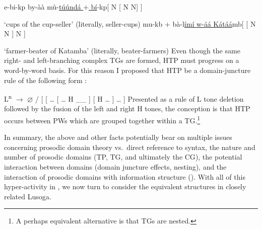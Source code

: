 \documentclass[output=paper]{langsci/langscibook}
\begin{document}
\ea\label{ex:13.18}
    \ea   e-bi-kp  by-àà  mù-\underline{túúndá $+$
    bí}-kp\hfill  [ N [ N N]
    ]\\\vspace{1\baselineskip}
		 ‘cups of the cup-seller’ (literally, seller-cups)
         \ex mu-kb $+$ bà-l\underline{ímí  w-áá
             Kátáá}mb\hfill [ [ N N ] N
             ]\\\vspace{1\baselineskip}
    ‘farmer-beater of Katamba' (literally, beater-farmers)
    \z
\z
Even though the same right- and left-branching complex \glspl{TG} are formed,
\gls{HTP} must progress on a word-by-word basis. For this reason I proposed
that \gls{HTP} be a domain-juncture rule of the following form
\citep[158]{Hyman1988}:

\ea\label{ex:13.19}
    L\textsuperscript{n}  ${\rightarrow}$  $\varnothing$  /  [  [ \dots{} [ \dots{} H \_\_ ] [ H \dots{} ] \dots{} ]
\z
Presented as a rule of L tone deletion followed by the fusion of the left and
right H tones, the conception is that \gls{HTP} occurs between \glspl{PW} which
are grouped together within a \gls{TG}.\footnote{A perhaps equivalent
    alternative is that \glspl{TG} are nested.}

In summary, the above and other  facts potentially bear on multiple
issues concerning prosodic domain theory vs.\ direct reference to syntax, the
nature and number of prosodic domains (\gls{TP}, \gls{TG}, and ultimately the
\gls{CG}), the potential interaction between domains (domain juncture effects,
nesting), and the interaction of prosodic domains with information structure
(). With all of this hyper-activity in , we now turn to consider
the equivalent structures in closely related Lusoga.
\end{document}
